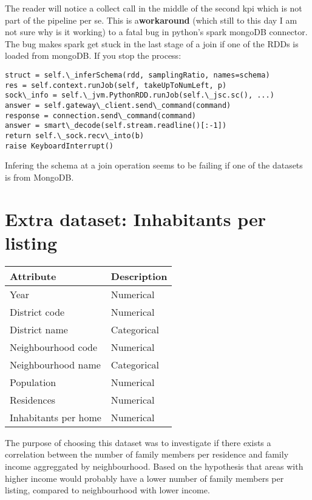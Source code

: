 \documentclass[12pt, a4paper]{article}
\begin{document}
The reader will notice a collect call in the middle of the second kpi which is not part of the pipeline per se.
This is a\textbf{workaround} (which still to this day I am not sure why is it working) to a fatal bug in python's spark mongoDB connector.
The bug makes spark get stuck in the last stage of a join if one of the RDDs is loaded from mongoDB. If you stop the process:

\begin{lstlisting}
struct = self.\_inferSchema(rdd, samplingRatio, names=schema)
res = self.context.runJob(self, takeUpToNumLeft, p)
sock\_info = self.\_jvm.PythonRDD.runJob(self.\_jsc.sc(), ...)
answer = self.gateway\_client.send\_command(command)
response = connection.send\_command(command)
answer = smart\_decode(self.stream.readline()[:-1])
return self.\_sock.recv\_into(b)
raise KeyboardInterrupt()
\end{lstlisting}

Infering the schema at a join operation seems to be failing if one of the datasets is from MongoDB.

\section{Extra dataset: Inhabitants per listing}

\begin{table}[h!]
\begin{tabular}{l|l}
Attribute & Description \\ \hline
Year & Numerical \\
District code & Numerical \\
District name & Categorical \\
Neighbourhood code & Numerical \\
Neighbourhood name & Categorical \\
Population & Numerical \\
Residences & Numerical \\
Inhabitants per home & Numerical
\end{tabular}
\end{table}

The purpose of choosing this dataset was to investigate if there exists a correlation between the number of family members per residence and family income aggreggated by neighbourhood. Based on the hypothesis that areas with higher income would probably have a lower number of family members per listing, compared to neighbourhood with lower income.
\end{document}
